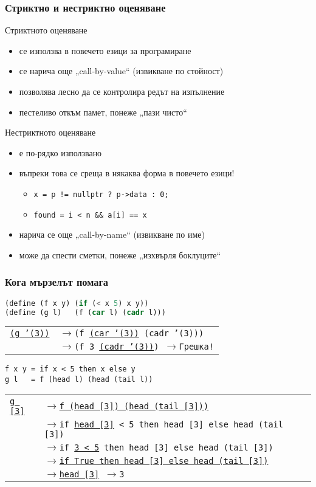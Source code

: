 \documentclass[alsotrans,beameroptions={aspectratio=169}]{beamerswitch}
\newcommand{\lra}{\onslide<+->$\longrightarrow$\xspace}
\begin{document}
\begin{frame}
  \frametitle{Стриктно и нестриктно оценяване}

  Стриктното оценяване
  \begin{itemize}[<+->]
  \item се използва в повечето езици за програмиране
  \item се нарича още „call-by-value“ (извикване по стойност)
  \item позволява лесно да се контролира редът на изпълнение
  \item пестеливо откъм памет, понеже „пази чисто“
  \end{itemize}
  \onslide<+->
  Нестриктното оценяване
  \begin{itemize}[<+->]
  \item е по-рядко използвано
  \item въпреки това се среща в някаква форма в повечето езици!
    \begin{itemize}
    \item \tt{x = p != nullptr ? p->data : 0;}
    \item \tt{found = i < n \&\& a[i] == x}
    \end{itemize}
  \item нарича се още „call-by-name“ (извикване по име)
  \item може да спести сметки, понеже „изхвърля боклуците“
  \end{itemize}
\end{frame}

\begin{frame}[fragile]
  \frametitle{Кога мързелът помага}

\begin{lstlisting}[language=Scheme]
(define (f x y) (if (< x 5) x y))
(define (g l)   (f (car l) (cadr l)))
\end{lstlisting}
\pause
\begin{tabular}[t]{l@{}l}
\tt{\underline{(g '(3))}}
&\lra \tt{(f \underline{(car '(3))} (cadr '(3)))}\\
&\lra \tt{(f 3 \underline{(cadr '(3))})}
\lra \alert{Грешка!}
\end{tabular}
\onslide<+->
\begin{lstlisting}
f x y = if x < 5 then x else y
g l   = f (head l) (head (tail l))
\end{lstlisting}
\onslide<+->
\begin{tabular}[t]{l@{}l}
\tt{\underline{g [3]}}
&\lra \tt{\underline{f (head [3]) (head (tail [3]))}}\\
&\lra \tt{if} \underline{\tt{head [3]}} \tt{< 5 then head [3] else head (tail [3])}\\
&\lra \tt{if \underline{3 < 5} then head [3] else head (tail [3])}\\
&\lra \tt{\underline{if True then head [3] else head (tail [3])}}\\
&\lra \tt{\underline{head [3]}}
\lra \tt 3
\end{tabular}
\end{frame}
\end{document}
